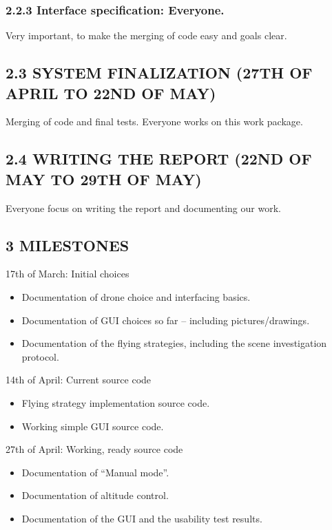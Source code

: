 \subsubsection*{2.2.3 Interface specification: Everyone.}
Very important, to make the merging of code easy and goals clear.\\
\subsection*{2.3 SYSTEM FINALIZATION (27TH OF APRIL TO 22ND OF MAY)} 
Merging of code and final tests.
Everyone works on this work package.
\subsection*{2.4 WRITING THE REPORT (22ND OF MAY TO 29TH OF MAY)}
Everyone focus on writing the report and documenting our work.
\subsection*{3 MILESTONES}
17th of March: Initial choices
\begin{itemize}
\item Documentation of drone choice and interfacing basics.
\item Documentation of GUI choices so far – including pictures/drawings.
\item Documentation of the flying strategies, including the scene investigation protocol.
\end{itemize}
14th of April: Current source code
\begin{itemize}
\item Flying strategy implementation source code.
\item Working simple GUI source code.
\end{itemize}
27th of April: Working, ready source code
\begin{itemize}
\item Documentation of “Manual mode”.
\item Documentation of altitude control.
\item Documentation of the GUI and the usability test results.
\end{itemize}

